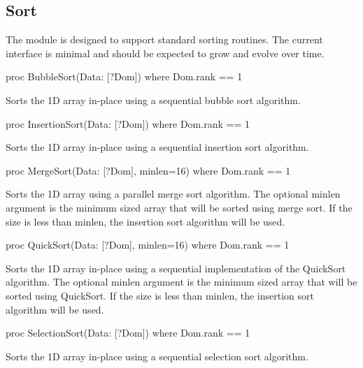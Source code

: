 \subsection{Sort}
\label{Sort}

The  module is designed to support standard sorting
routines.  The current interface is minimal and should be expected to
grow and evolve over time.

\begin{protohead}
proc BubbleSort(Data: [?Dom]) where Dom.rank == 1
\end{protohead}
\begin{protobody}
Sorts the 1D array  in-place using a sequential bubble sort
algorithm.
\end{protobody}

\begin{protohead}
proc InsertionSort(Data: [?Dom]) where Dom.rank == 1
\end{protohead}
\begin{protobody}
Sorts the 1D array  in-place using a sequential insertion
sort algorithm.
\end{protobody}

\begin{protohead}
proc MergeSort(Data: [?Dom], minlen=16) where Dom.rank == 1
\end{protohead}
\begin{protobody}
Sorts the 1D array  using a parallel merge sort algorithm.
The optional minlen argument is the minimum sized array that will be
sorted using merge sort.  If the size is less than minlen, the
insertion sort algorithm will be used.

\end{protobody}

\begin{protohead}
proc QuickSort(Data: [?Dom], minlen=16) where Dom.rank == 1
\end{protohead}
\begin{protobody}
Sorts the 1D array  in-place using a sequential
implementation of the QuickSort algorithm.  The optional minlen
argument is the minimum sized array that will be sorted using
QuickSort.  If the size is less than minlen, the insertion sort
algorithm will be used.
\end{protobody}

\begin{protohead}
proc SelectionSort(Data: [?Dom]) where Dom.rank == 1
\end{protohead}
\begin{protobody}
Sorts the 1D array  in-place using a sequential selection
sort algorithm.
\end{protobody}


